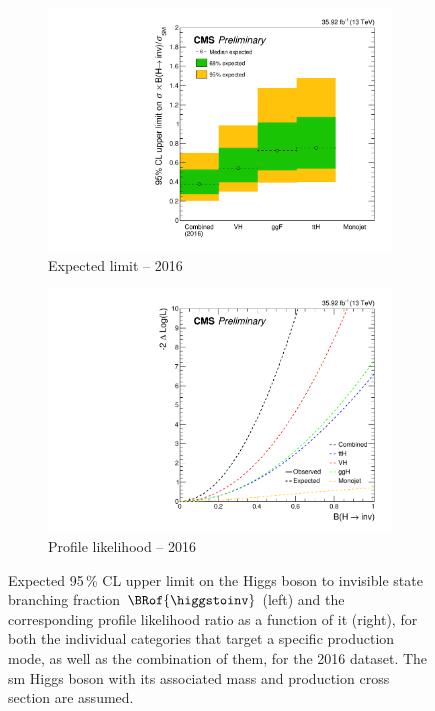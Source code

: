 \begin{figure}[htbp]
    \centering
    \begin{subfigure}[b]{0.45\textwidth}
        \includegraphics[width=\textwidth]{figures/limits/limit_2016_comb_Scenario4.pdf}
        \caption{Expected limit -- 2016}
    \end{subfigure}
    \hspace{0.05\textwidth}
    \begin{subfigure}[b]{0.45\textwidth}
        \includegraphics[width=\textwidth]{figures/likelihood_scan/profile_likelihood_scan_2016_Scenario4.pdf}
        \caption{Profile likelihood -- 2016}
    \end{subfigure}
    \caption[Expected 95\,\% CL upper limit on the Higgs boson to invisible state branching fraction $\BRof{\higgstoinv}$ and the corresponding profile likelihood ratio as a function of it, for both the individual categories that target a specific production mode, as well as the combination of them, for the 2016 dataset]{Expected 95\,\% CL upper limit on the Higgs boson to invisible state branching fraction $\BRof{\higgstoinv}$ (left) and the corresponding profile likelihood ratio as a function of it (right), for both the individual categories that target a specific production mode, as well as the combination of them, for the 2016 dataset. The \acrlong{sm} Higgs boson with its associated mass and production cross section are assumed.}
    \label{fig:htoinv_limit_likelihood_2016}
\end{figure}

